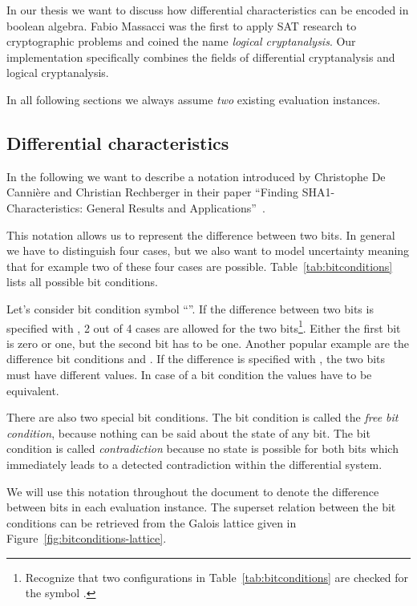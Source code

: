 In our thesis we want to discuss how differential characteristics can be encoded in boolean algebra. Fabio Massacci was the first to apply SAT research to cryptographic problems and coined the name \emph{logical cryptanalysis}. Our implementation specifically combines the fields of differential cryptanalysis and logical cryptanalysis.

In all following sections we always assume \emph{two} existing evaluation instances.

\subsection{Differential characteristics}
\label{sec:differential-characteristic}
%
In the following we want to describe a notation introduced by Christophe De Cannière and Christian Rechberger in their paper ``Finding SHA1-Characteristics: General Results and Applications''~\cite{Cry01}.

This notation allows us to represent the difference between two bits. In general we have to distinguish four cases, but we also want to model uncertainty meaning that for example two of these four cases are possible. Table~\ref{tab:bitconditions} lists all possible bit conditions.

Let's consider bit condition symbol ``''. If the difference between two bits is specified with , 2 out of 4 cases are allowed for the two bits\footnote{Recognize that two configurations in Table~\ref{tab:bitconditions} are checked for the symbol .}. Either the first bit is zero or one, but the second bit has to be one. Another popular example are the difference bit conditions  and \bc{-}. If the difference is specified with , the two bits must have different values. In case of a bit condition \bc{-} the values have to be equivalent.

There are also two special bit conditions. The bit condition  is called the \emph{free bit condition}, because nothing can be said about the state of any bit. The bit condition \bc{\#} is called \emph{contradiction} because no state is possible for both bits which immediately leads to a detected contradiction within the differential system.

We will use this notation throughout the document to denote the difference between bits in each evaluation instance. The superset relation between the bit conditions can be retrieved from the Galois lattice given in Figure~\ref{fig:bitconditions-lattice}.

